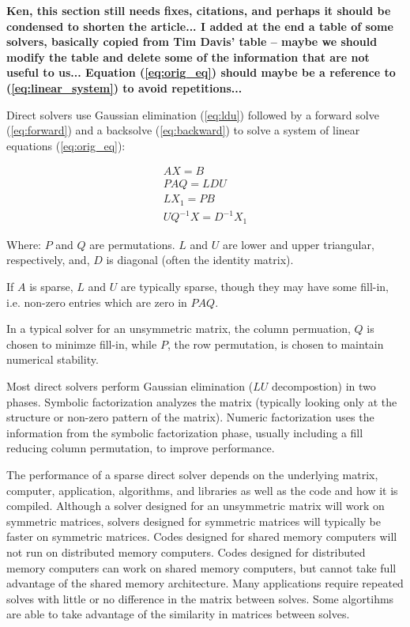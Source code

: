 \documentclass[acmtocl]{acmtrans2m}
\begin{document}
{\bf Ken, this section still needs fixes, citations, and perhaps it should
  be condensed to shorten the article... I added at the end a table of some
    solvers, basically copied from Tim Davis' table -- maybe we should modify
the table and delete some of the information that are not useful to us...
Equation (\ref{eq:orig_eq}) should maybe be a reference to
(\ref{eq:linear_system}) to avoid repetitions...}

Direct solvers use Gaussian elimination (\ref{eq:ldu}) followed by a
forward solve (\ref{eq:forward}) and a backsolve (\ref{eq:backward})
to solve a system of linear equations (\ref{eq:orig_eq}):

\begin{eqnarray}
  \label{eq:orig_eq}
  A X = B \\ 
  \label{eq:ldu}
  PAQ = LDU \\
  \label{eq:forward}
  LX_1 = PB \\
  \label{eq:backward}
  UQ^{-1}X = D^{-1}X_1  
\end{eqnarray}

Where: $P$ and $Q$ are permutations.  $L$ and $U$ are lower and upper triangular, respectively, and, $D$ is diagonal (often the identity matrix).  

If $A$ is sparse, $L$ and $U$
are typically sparse, though they may have some fill-in, i.e. non-zero entries which are zero in
$PAQ$.  

In a typical solver for an unsymmetric matrix, the column permuation,
$Q$ is chosen to minimze fill-in, while $P$, the row permutation, is
chosen to maintain numerical stability.  

Most direct solvers perform Gaussian elimination ($LU$ decompostion) in
two phases.  Symbolic factorization analyzes the matrix (typically
looking only at the structure or non-zero pattern of the matrix).
Numeric factorization uses the information from the symbolic
factorization phase, usually including a fill reducing column permutation, 
to improve performance.  

The performance of a sparse direct solver depends on the underlying
matrix, computer, application, algorithms, and libraries as well as
the code and how it is compiled.  Although a solver designed for an
unsymmetric matrix will work on symmetric matrices, solvers designed
for symmetric matrices will typically be faster on symmetric matrices.
Codes designed for shared memory computers will not run on distributed
memory computers.  Codes designed for distributed memory computers can
work on shared memory computers, but cannot take full advantage of the
shared memory architecture.  Many applications require repeated solves
with little or no difference in the matrix between solves.  Some
algortihms are able to take advantage of the similarity in matrices
between solves.
\end{document}
